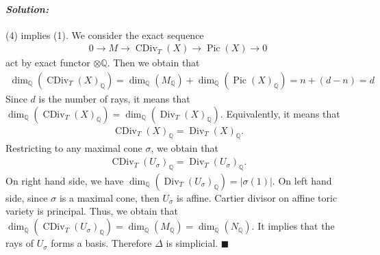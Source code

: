\documentclass[12pt, a4paper]{article}
\newenvironment{solution}
  {\paragraph{\textit{Solution:}}\par\medskip}
  {\hfill$\blacksquare$\vspace{0.1cm}}
\begin{document}
\begin{solution}
    (4) implies (1). We consider the exact sequence
    \begin{align*}
        0 \to M \to \operatorname{CDiv}_T(X) \to \operatorname{Pic}(X) \to 0
    \end{align*}
    act by exact functor $\otimes \mathbb{Q}$. Then we obtain that 
    \begin{align*}
        \dim_\mathbb{Q}(\operatorname{CDiv}_T(X)_\mathbb{Q}) = \dim_\mathbb{Q}(M_\mathbb{Q}) + \dim_\mathbb{Q}(\operatorname{Pic}(X)_\mathbb{Q}) = n + (d - n) = d
    \end{align*}
    Since $d$ is the number of rays, it means that $\dim_\mathbb{Q}(\operatorname{CDiv}_T(X)_\mathbb{Q})= \dim_\mathbb{Q}(\operatorname{Div}_T(X)_\mathbb{Q})$. 
    Equivalently, it means that 
    \begin{align*}
        \operatorname{CDiv}_T(X)_\mathbb{Q} =\operatorname{Div}_T(X)_\mathbb{Q}.
    \end{align*}
    Restricting to any maximal cone $\sigma$, we obtain that 
    \begin{align*}
        \operatorname{CDiv}_T(U_\sigma)_\mathbb{Q} =\operatorname{Div}_T(U_\sigma)_\mathbb{Q}.
    \end{align*}
    On right hand side, we have $\dim_\mathbb{Q}(\operatorname{Div}_T(U_\sigma)_\mathbb{Q})=|\sigma(1)|$.
    On left hand side, since $\sigma$ is a maximal cone, then $U_\sigma$ is affine. Cartier divisor on affine toric variety is principal.
    Thus, we obtain that $\dim_\mathbb{Q}(\operatorname{CDiv}_T(U_\sigma)_\mathbb{Q})=\dim_\mathbb{Q}(M_\mathbb{Q})= \dim_\mathbb{Q}(N_\mathbb{Q})$.
    It implies that the rays of $U_\sigma$ forms a basis. Therefore $\Delta$ is simplicial.
\end{solution}
\end{document}
